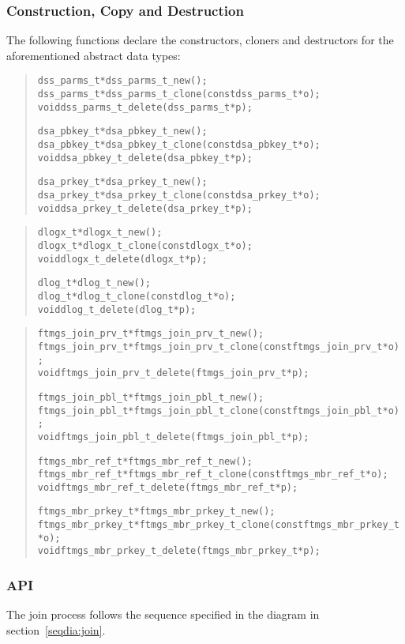 \documentclass[a4paper]{article}
\newenvironment{code}%
{\begin{quote}\footnotesize\begin{alltt}}%
{\end{alltt}\end{quote}}%
\begin{document}
\subsubsection*{Construction, Copy and Destruction}
The following functions declare the constructors, cloners and destructors
for the aforementioned abstract data types:
\begin{code}
dss_parms_t* dss_parms_t_new();
dss_parms_t* dss_parms_t_clone(const dss_parms_t* o);
void dss_parms_t_delete(dss_parms_t* p);

dsa_pbkey_t* dsa_pbkey_t_new();
dsa_pbkey_t* dsa_pbkey_t_clone(const dsa_pbkey_t* o);
void dsa_pbkey_t_delete(dsa_pbkey_t* p);

dsa_prkey_t* dsa_prkey_t_new();
dsa_prkey_t* dsa_prkey_t_clone(const dsa_prkey_t* o);
void dsa_prkey_t_delete(dsa_prkey_t* p);
\end{code}
\begin{code}
dlogx_t* dlogx_t_new();
dlogx_t* dlogx_t_clone(const dlogx_t* o);
void dlogx_t_delete(dlogx_t* p);

dlog_t* dlog_t_new();
dlog_t* dlog_t_clone(const dlog_t* o);
void dlog_t_delete(dlog_t* p);
\end{code}
\begin{code}
ftmgs_join_prv_t* ftmgs_join_prv_t_new();
ftmgs_join_prv_t* ftmgs_join_prv_t_clone(const ftmgs_join_prv_t* o);
void ftmgs_join_prv_t_delete(ftmgs_join_prv_t* p);

ftmgs_join_pbl_t* ftmgs_join_pbl_t_new();
ftmgs_join_pbl_t* ftmgs_join_pbl_t_clone(const ftmgs_join_pbl_t* o);
void ftmgs_join_pbl_t_delete(ftmgs_join_pbl_t* p);

ftmgs_mbr_ref_t* ftmgs_mbr_ref_t_new();
ftmgs_mbr_ref_t* ftmgs_mbr_ref_t_clone(const ftmgs_mbr_ref_t* o);
void ftmgs_mbr_ref_t_delete(ftmgs_mbr_ref_t* p);

ftmgs_mbr_prkey_t* ftmgs_mbr_prkey_t_new();
ftmgs_mbr_prkey_t* ftmgs_mbr_prkey_t_clone(const ftmgs_mbr_prkey_t* o);
void ftmgs_mbr_prkey_t_delete(ftmgs_mbr_prkey_t* p);
\end{code}
\subsubsection*{API}
The join process follows the sequence specified in the diagram in
section~\ref{seqdia:join}.
\end{document}
